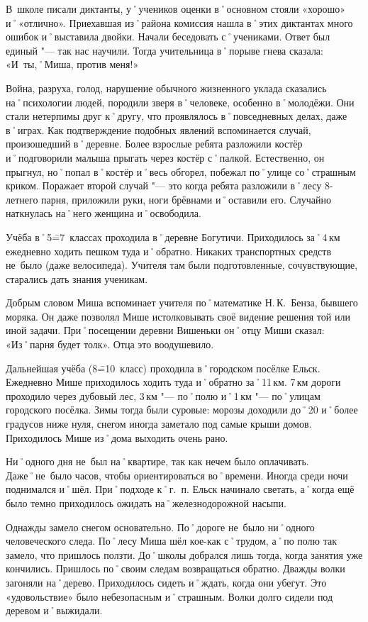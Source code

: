В~школе писали диктанты, у˚учеников оценки в˚основном стояли «хорошо» и˚«отлично». Приехавшая из˚района комиссия нашла в˚этих диктантах много ошибок и˚выставила двойки. Начали беседовать с˚учениками. Ответ был единый "--- так нас научили. Тогда учительница в˚порыве гнева сказала: «И~ты,˚Миша, против меня!»

Война, разруха, голод, нарушение обычного жизненного уклада сказались на˚психологии людей, породили зверя в˚человеке, особенно в˚молодёжи. Они стали нетерпимы друг к˚другу, что проявлялось в˚повседневных делах, даже в˚играх. Как подтверждение подобных явлений вспоминается случай, произошедший в˚деревне. Более взрослые ребята разложили костёр и˚подговорили малыша прыгать через костёр с˚палкой. Естественно, он прыгнул, но˚попал в˚костёр и˚весь обгорел, побежал по˚улице со˚страшным криком. Поражает второй случай "--- это когда ребята разложили в˚лесу 8-летнего парня, приложили руки, ноги брёвнами и˚оставили его. Случайно наткнулась на˚него женщина и˚освободила.

Учёба в˚5\==7~классах проходила в˚деревне Богутичи. Приходилось за˚4\,км ежедневно ходить пешком туда и˚обратно. Никаких транспортных средств не~было (даже велосипеда). Учителя там были подготовленные, сочувствующие, старались дать знания ученикам. 

Добрым словом Миша вспоминает учителя по˚математике Н.\,К.~Бенза, бывшего моряка. Он даже позволял Мише истолковывать своё видение решения той или иной задачи. При˚посещении деревни Вишеньки он˚отцу Миши сказал: «Из˚парня будет толк». Отца это воодушевило.

Дальнейшая учёба (8\==10~класс) проходила в˚городском посёлке Ельск. Ежедневно Мише приходилось ходить туда и˚обратно за˚11\,км. 7\,км дороги проходило через дубовый лес, 3\,км "--- по˚полю и˚1\,км "--- по˚улицам городского посёлка. Зимы тогда были суровые: морозы доходили до˚20 и˚более градусов ниже нуля, снегом иногда заметало под самые крыши домов. Приходилось Мише из˚дома выходить очень рано. 

Ни˚одного дня не~был на˚квартире, так как нечем было оплачивать. Даже˚не~было часов, чтобы ориентироваться во˚времени. Иногда среди ночи поднимался и˚шёл. При˚подходе к˚г.~п. Ельск начинало светать, а˚когда ещё было темно приходилось ожидать на˚железнодорожной насыпи.

Однажды замело снегом основательно. По˚дороге не~было ни˚одного человеческого следа. По˚лесу Миша шёл кое-как с˚трудом, а˚по полю так замело, что пришлось ползти. До˚школы добрался лишь тогда, когда занятия уже кончились. Пришлось по˚своим следам возвращаться обратно. Дважды волки загоняли на˚дерево. Приходилось сидеть и˚ждать, когда они убегут. Это «удовольствие» было небезопасным и˚страшным. Волки долго сидели под деревом и˚выжидали.
\enlargethispage{\baselineskip}		%
\pagebreak							%

